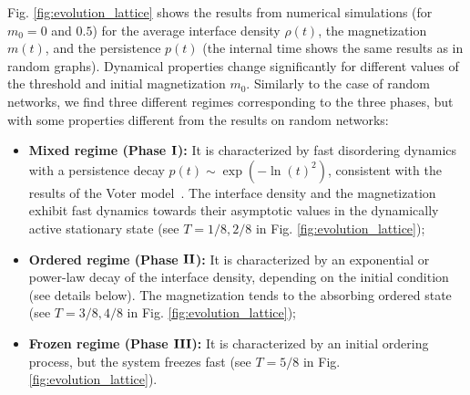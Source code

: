 Fig. \ref{fig:evolution_lattice} shows the results from numerical simulations (for $m_0 = 0$ and $0.5$) for the average interface density $\rho(t)$, the magnetization $m(t)$, and the persistence $p(t)$ (the internal time shows the same results as in random graphs). Dynamical properties change significantly for different values of the threshold and initial magnetization $m_0$. Similarly to the case of random networks, we find three different regimes corresponding to the three phases, but with some properties different from the results on  random networks:
\begin{itemize}
	\item \textbf{Mixed regime (Phase ${\rm {\bf I}}$):} It is characterized by fast disordering dynamics with a persistence decay $p(t) \sim \exp(- \ln(t)^2)$, consistent with the results of the Voter model~\cite{ben-naim-1996}. The interface density and the magnetization exhibit fast dynamics towards their asymptotic values in the dynamically active stationary state (see $T = 1/8,2/8$ in Fig. \ref{fig:evolution_lattice});
	\item \textbf{Ordered regime (Phase ${\rm {\bf II}}$):} It is characterized by an exponential or power-law decay of the interface density, depending on the initial condition (see details below). The magnetization tends to the absorbing ordered state (see $T = 3/8,4/8$ in Fig. \ref{fig:evolution_lattice});
	\item \textbf{Frozen regime (Phase ${\rm {\bf III}}$):} It is characterized by an initial ordering process, but the system freezes fast (see $T = 5/8$ in Fig. \ref{fig:evolution_lattice}).
\end{itemize}

